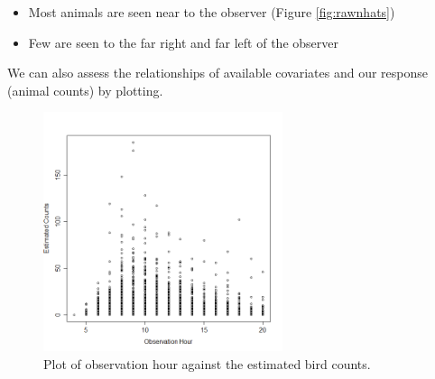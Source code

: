 \documentclass[11pt, a4paper]{article}
\begin{document}
\begin{itemize}
\item Most animals are seen near to the observer (Figure \ref{fig:rawnhats})
\item Few are seen to the far right and far left of the observer
\end{itemize}


\begin{frame}
\noindent We can also assess the relationships of available covariates and our response (animal counts) by plotting.
\begin{figure}[h]
  \centering
  \includegraphics[width=7cm]{obshour.png}
\caption{Plot of observation hour against the estimated bird counts.}
\label{fig:exploratory1}
\end{figure}
\end{frame}
\end{document}
